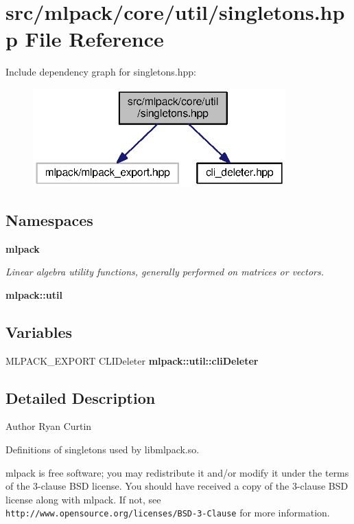 \section{src/mlpack/core/util/singletons.hpp File Reference}
\label{singletons_8hpp}
Include dependency graph for singletons.\+hpp\+:
\nopagebreak
\begin{figure}[H]
\begin{center}
\leavevmode
\includegraphics[width=276pt]{singletons_8hpp__incl}
\end{center}
\end{figure}
\subsection*{Namespaces}
\begin{DoxyCompactItemize}
\item 
 {\bf mlpack}
\begin{DoxyCompactList}\small\item\em Linear algebra utility functions, generally performed on matrices or vectors. \end{DoxyCompactList}\item 
 {\bf mlpack\+::util}
\end{DoxyCompactItemize}
\subsection*{Variables}
\begin{DoxyCompactItemize}
\item 
M\+L\+P\+A\+C\+K\+\_\+\+E\+X\+P\+O\+RT C\+L\+I\+Deleter {\bf mlpack\+::util\+::cli\+Deleter}
\end{DoxyCompactItemize}


\subsection{Detailed Description}
\begin{DoxyAuthor}{Author}
Ryan Curtin
\end{DoxyAuthor}
Definitions of singletons used by libmlpack.\+so.

mlpack is free software; you may redistribute it and/or modify it under the terms of the 3-\/clause B\+SD license. You should have received a copy of the 3-\/clause B\+SD license along with mlpack. If not, see {\tt http\+://www.\+opensource.\+org/licenses/\+B\+S\+D-\/3-\/\+Clause} for more information. 